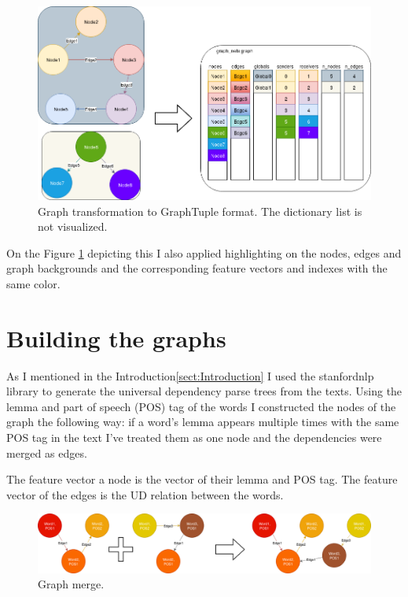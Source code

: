\begin{figure}[!ht]
	\centering
	\includegraphics[width=150mm, keepaspectratio]{figures/transform_multiple.png}
	\caption{Graph transformation to GraphTuple format. The dictionary list is not visualized.}
	\label{fig:transform_multiple}
\end{figure}

On the Figure \ref{fig:transform_multiple} depicting this I also applied highlighting on the nodes, edges and graph backgrounds and the corresponding feature vectors and indexes with the same color.

\section{Building the graphs}

As I mentioned in the Introduction\ref{sect:Introduction} I used the stanfordnlp library to generate the universal dependency parse trees from the texts. Using the lemma and part of speech (POS) tag of the words I constructed the nodes of the graph the following way: if a word's lemma appears multiple times with the same POS tag in the text I've treated them as one node and the dependencies were merged as edges.

The feature vector a node is the vector of their lemma and POS tag. The feature vector of the edges is the UD relation between the words.

\begin{figure}[!ht]
	\centering
	\includegraphics[width=150mm, keepaspectratio]{figures/merge_graphs_color.png}
	\caption{Graph merge.}
	\label{fig:merge_graph_color}
\end{figure}

